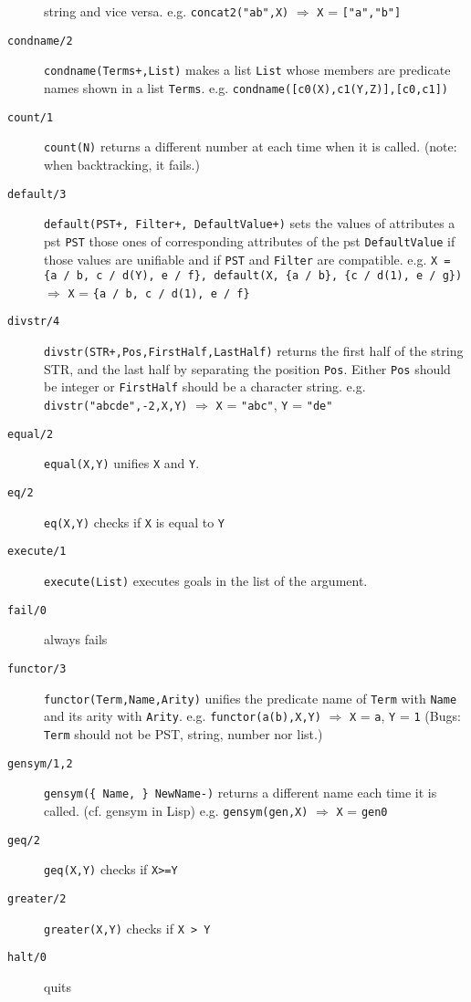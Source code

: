 \begin{description}
	 string and vice versa. e.g. {\tt concat2("ab",X)} $\Rightarrow$
	{\tt X} = {\tt ["a","b"]}
 \item[{\tt condname/2}] {\tt condname(Terms+,List)}  makes a list {\tt List}
	whose members are predicate names shown in a list {\tt Terms}.
	e.g. {\tt condname([c0(X),c1(Y,Z)],[c0,c1])} 
 \item[{\tt count/1}] {\tt count(N)} returns a different number at each
	time when it is called. (note: when backtracking, it fails.)
 \item[{\tt default/3}]
        {\tt default(PST+, Filter+, DefaultValue+)} sets
	the values of attributes a pst	{\tt PST}
	those ones of corresponding attributes of the pst {\tt DefaultValue}
	if those values are unifiable and if {\tt PST} and {\tt Filter}
	are compatible. e.g. {\tt X = \{a / b, c / d(Y), e / f\},
	default(X, \{a / b\}, \{c / d(1), e / g\})} $\Rightarrow$
	{\tt X} = {\tt \{a / b, c / d(1), e / f\}}
 \item[{\tt divstr/4}]
         {\tt divstr(STR+,Pos,FirstHalf,LastHalf)} returns
the first half of the string STR, and the last half by separating the
position {\tt Pos}. Either {\tt Pos} should be integer or {\tt FirstHalf} 
should be a character string. e.g. {\tt divstr("abcde",-2,X,Y)} $\Rightarrow$ 
{\tt X} = {\tt "abc"}, {\tt Y} = {\tt "de"}
 \item[{\tt equal/2}] {\tt equal(X,Y)} unifies {\tt X} and {\tt Y}.
 \item [{\tt eq/2}] {\tt eq(X,Y)} checks if {\tt X} is equal to {\tt Y}
 \item [{\tt execute/1}] {\tt execute(List)} executes goals in the
list of the argument.
 \item[{\tt fail/0}] always fails
 \item [{\tt functor/3}]  {\tt functor(Term,Name,Arity)} unifies the predicate
name of {\tt Term} with {\tt Name} and its arity  with {\tt Arity}.
e.g. {\tt functor(a(b),X,Y)} $\Rightarrow$ {\tt X} = {\tt a},
{\tt Y} = {\tt 1} 
(Bugs: {\tt Term} should not be PST, string, number nor list.)
 \item [{\tt gensym/1,2}] {\tt gensym(\{ Name, \} NewName-)} returns a
different name each time it is called. 
(cf. gensym in Lisp) e.g. {\tt gensym(gen,X)} $\Rightarrow$ {\tt X} =
{\tt gen0}
 \item[{\tt geq/2}] {\tt geq(X,Y)} checks if {\tt X>=Y}
 \item [{\tt greater/2}]  {\tt greater(X,Y)} checks if {\tt X > Y}
 \item [{\tt halt/0}] quits \cuprolog

\end{description}
